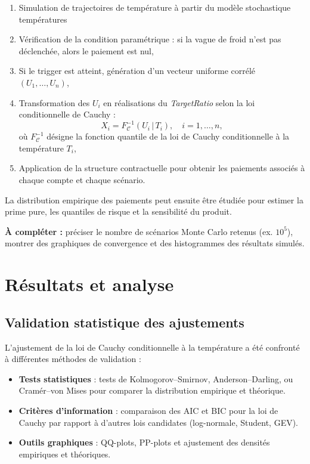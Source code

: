 \documentclass[11pt,a4paper,openright,twoside]{report}
\begin{document}
\begin{enumerate}
    \item Simulation de trajectoires de température à partir du modèle stochastique températures
    \item Vérification de la condition paramétrique : si la vague de froid n’est pas déclenchée, alors le paiement est nul,
    \item Si le trigger est atteint, génération d’un vecteur uniforme corrélé $(U_1, \dots, U_n)$,
    \item Transformation des $U_i$ en réalisations du \textit{TargetRatio} selon la loi conditionnelle de Cauchy :  
    \begin{equation}
        X_i = F^{-1}_{\mathcal{C}}(U_i \,|\, T_{i}), \quad i = 1, \dots, n,
    \end{equation}
    où $F^{-1}_{\mathcal{C}}$ désigne la fonction quantile de la loi de Cauchy conditionnelle à la température $T_{i}$,
    \item Application de la structure contractuelle pour obtenir les paiements associés à chaque compte et chaque scénario.
\end{enumerate}

La distribution empirique des paiements peut ensuite être étudiée pour estimer la prime pure, les quantiles de risque et la sensibilité du produit.  

\textbf{À compléter :} préciser le nombre de scénarios Monte Carlo retenus (ex. $10^5$), montrer des graphiques de convergence et des histogrammes des résultats simulés.

\chapter{Résultats et analyse}

\section{Validation statistique des ajustements}
L’ajustement de la loi de Cauchy conditionnelle à la température a été confronté à différentes méthodes de validation :
\begin{itemize}
    \item \textbf{Tests statistiques} : tests de Kolmogorov–Smirnov, Anderson–Darling, ou Cramér–von Mises pour comparer la distribution empirique et théorique.
    \item \textbf{Critères d’information} : comparaison des AIC et BIC pour la loi de Cauchy par rapport à d’autres lois candidates (log-normale, Student, GEV).
    \item \textbf{Outils graphiques} : QQ-plots, PP-plots et ajustement des densités empiriques et théoriques.
\end{itemize}
\end{document}
